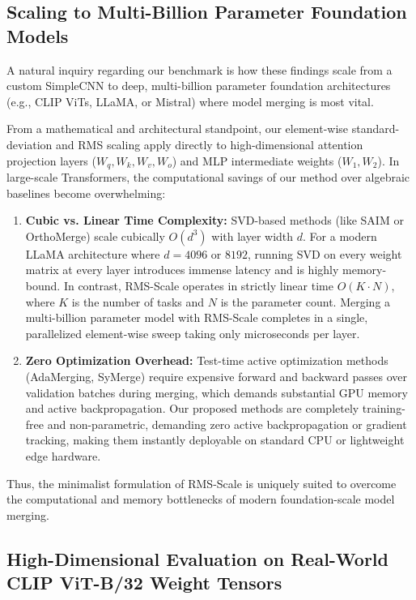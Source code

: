 \subsection{Scaling to Multi-Billion Parameter Foundation Models}

A natural inquiry regarding our benchmark is how these findings scale from a custom SimpleCNN to deep, multi-billion parameter foundation architectures (e.g., CLIP ViTs, LLaMA, or Mistral) where model merging is most vital.

From a mathematical and architectural standpoint, our element-wise standard-deviation and RMS scaling apply directly to high-dimensional attention projection layers ($W_q, W_k, W_v, W_o$) and MLP intermediate weights ($W_1, W_2$). In large-scale Transformers, the computational savings of our method over algebraic baselines become overwhelming:
\begin{enumerate}
    \item \textbf{Cubic vs. Linear Time Complexity:} SVD-based methods (like SAIM or OrthoMerge) scale cubically $O(d^3)$ with layer width $d$. For a modern LLaMA architecture where $d = 4096$ or $8192$, running SVD on every weight matrix at every layer introduces immense latency and is highly memory-bound. In contrast, RMS-Scale operates in strictly linear time $O(K \cdot N)$, where $K$ is the number of tasks and $N$ is the parameter count. Merging a multi-billion parameter model with RMS-Scale completes in a single, parallelized element-wise sweep taking only microseconds per layer.
    \item \textbf{Zero Optimization Overhead:} Test-time active optimization methods (AdaMerging, SyMerge) require expensive forward and backward passes over validation batches during merging, which demands substantial GPU memory and active backpropagation. Our proposed methods are completely training-free and non-parametric, demanding zero active backpropagation or gradient tracking, making them instantly deployable on standard CPU or lightweight edge hardware.
\end{enumerate}
Thus, the minimalist formulation of RMS-Scale is uniquely suited to overcome the computational and memory bottlenecks of modern foundation-scale model merging.

\subsection{High-Dimensional Evaluation on Real-World CLIP ViT-B/32 Weight Tensors}
\label{submission:sec:high_dim_sim}

